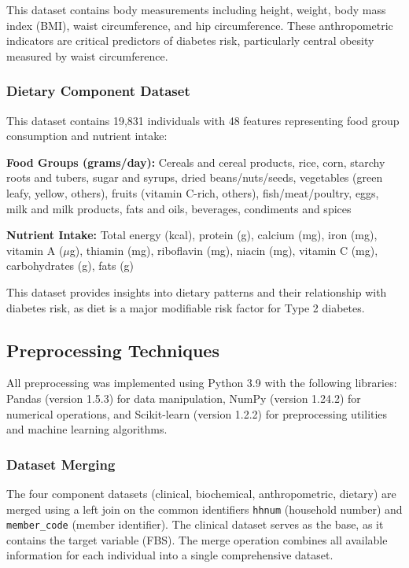 This dataset contains body measurements including height, weight, body mass index (BMI), waist circumference, and hip circumference. These anthropometric indicators are critical predictors of diabetes risk, particularly central obesity measured by waist circumference.

\subsubsection{Dietary Component Dataset}

This dataset contains 19,831 individuals with 48 features representing food group consumption and nutrient intake:

\textbf{Food Groups (grams/day):} Cereals and cereal products, rice, corn, starchy roots and tubers, sugar and syrups, dried beans/nuts/seeds, vegetables (green leafy, yellow, others), fruits (vitamin C-rich, others), fish/meat/poultry, eggs, milk and milk products, fats and oils, beverages, condiments and spices

\textbf{Nutrient Intake:} Total energy (kcal), protein (g), calcium (mg), iron (mg), vitamin A ($\mu$g), thiamin (mg), riboflavin (mg), niacin (mg), vitamin C (mg), carbohydrates (g), fats (g)

This dataset provides insights into dietary patterns and their relationship with diabetes risk, as diet is a major modifiable risk factor for Type 2 diabetes.

\subsection{Preprocessing Techniques}

All preprocessing was implemented using Python 3.9 with the following libraries: Pandas (version 1.5.3) for data manipulation, NumPy (version 1.24.2) for numerical operations, and Scikit-learn (version 1.2.2) for preprocessing utilities and machine learning algorithms.

\subsubsection{Dataset Merging}

The four component datasets (clinical, biochemical, anthropometric, dietary) are merged using a left join on the common identifiers \texttt{hhnum} (household number) and \texttt{member\_code} (member identifier). The clinical dataset serves as the base, as it contains the target variable (FBS). The merge operation combines all available information for each individual into a single comprehensive dataset.

